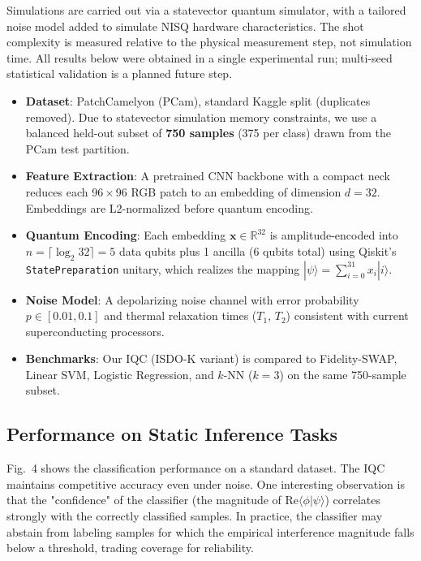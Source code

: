\documentclass[conference]{IEEEtran}
\begin{document}
Simulations are carried out via a statevector quantum simulator, with a tailored noise model added to simulate NISQ hardware characteristics. The shot complexity is measured relative to the physical measurement step, not simulation time. All results below were obtained in a single experimental run; multi-seed statistical validation is a planned future step.
\begin{itemize}
    \item \textbf{Dataset}: PatchCamelyon (PCam), standard Kaggle split (duplicates removed). Due to statevector simulation memory constraints, we use a balanced held-out subset of \textbf{750 samples} (375 per class) drawn from the PCam test partition.
    \item \textbf{Feature Extraction}: A pretrained CNN backbone with a compact neck reduces each 96\,$\times$\,96 RGB patch to an embedding of dimension $d = 32$. Embeddings are L2-normalized before quantum encoding.
    \item \textbf{Quantum Encoding}: Each embedding $\mathbf{x} \in \mathbb{R}^{32}$ is amplitude-encoded into $n = \lceil \log_2 32 \rceil = 5$ data qubits plus 1 ancilla (6 qubits total) using Qiskit's \texttt{StatePreparation} unitary, which realizes the mapping $|\psi\rangle = \sum_{i=0}^{31} x_i|i\rangle$.
    \item \textbf{Noise Model}: A depolarizing noise channel with error probability $p \in [0.01, 0.1]$ and thermal relaxation times ($T_1$, $T_2$) consistent with current superconducting processors.
    \item \textbf{Benchmarks}: Our IQC (ISDO-K variant) is compared to Fidelity-SWAP, Linear SVM, Logistic Regression, and $k$-NN ($k=3$) on the same 750-sample subset.
\end{itemize}

\subsection{Performance on Static Inference Tasks}

Fig.~4 shows the classification performance on a standard dataset. The IQC maintains competitive accuracy even under noise. One interesting observation is that the "confidence" of the classifier (the magnitude of $\text{Re}\langle \phi|\psi \rangle$) correlates strongly with the correctly classified samples. In practice, the classifier may abstain from labeling samples for which the empirical interference magnitude falls below a threshold, trading coverage for reliability.
\end{document}
